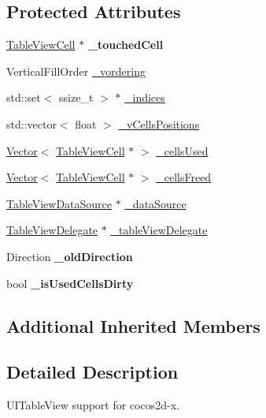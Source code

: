 \subsection*{Protected Attributes}
\begin{DoxyCompactItemize}
\item 
\mbox{\label{classTableView_af9e26d2378247f5631ee67302c54121d}} 
\hyperlink{classTableViewCell}{Table\+View\+Cell} $\ast$ {\bfseries \+\_\+touched\+Cell}
\item 
Vertical\+Fill\+Order \hyperlink{classTableView_a6cbf92892d660a0783a25e301c8f9358}{\+\_\+vordering}
\item 
std\+::set$<$ ssize\+\_\+t $>$ $\ast$ \hyperlink{classTableView_ade6d803003ab47ae75cf86e8fffeb313}{\+\_\+indices}
\item 
std\+::vector$<$ float $>$ \hyperlink{classTableView_a1f5376c490fbbfe40edf5e016c364567}{\+\_\+v\+Cells\+Positions}
\item 
\hyperlink{classVector}{Vector}$<$ \hyperlink{classTableViewCell}{Table\+View\+Cell} $\ast$ $>$ \hyperlink{classTableView_aa3996f96046814cc6fca417ea794dac1}{\+\_\+cells\+Used}
\item 
\hyperlink{classVector}{Vector}$<$ \hyperlink{classTableViewCell}{Table\+View\+Cell} $\ast$ $>$ \hyperlink{classTableView_a401a2ee88c8b610ffe98e761a7ae7612}{\+\_\+cells\+Freed}
\item 
\hyperlink{classTableViewDataSource}{Table\+View\+Data\+Source} $\ast$ \hyperlink{classTableView_a2b8ece22aaa72b09778f4b82adb75cbf}{\+\_\+data\+Source}
\item 
\hyperlink{classTableViewDelegate}{Table\+View\+Delegate} $\ast$ \hyperlink{classTableView_a8ce7267b530c5e8d23cf60518527eeca}{\+\_\+table\+View\+Delegate}
\item 
\mbox{\label{classTableView_a75a062d57f38300295656c653432818f}} 
Direction {\bfseries \+\_\+old\+Direction}
\item 
\mbox{\label{classTableView_a34c672662c4c5628a4017308d0d84f27}} 
bool {\bfseries \+\_\+is\+Used\+Cells\+Dirty}
\end{DoxyCompactItemize}
\subsection*{Additional Inherited Members}


\subsection{Detailed Description}
U\+I\+Table\+View support for cocos2d-\/x.

